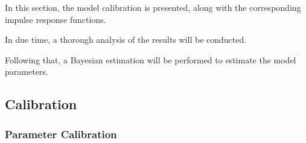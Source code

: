 \documentclass[
thesis.tex
]{subfiles}
\begin{document}
In this section, the model calibration is presented, along with the corresponding impulse response functions.

In due time, a thorough analysis of the results will be conducted.

Following that, a Bayesian estimation will be performed to estimate the model parameters.
	
	\subsection{Calibration}
	
	
	\subsubsection{Parameter Calibration}
	
	\vspace*{0.5cm}
	
\end{document}
